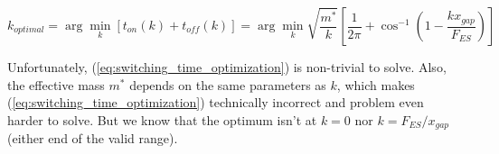 \begin{equation}
    k_{optimal} = \arg\min_k \left[ t_{on}(k) + t_{off}(k) \right] = \arg\min_k \sqrt{\frac{m^*}{k}} \left[ \frac{1}{2\pi} + \cos^{-1}{\left( 1 - \frac{k x_{gap}}{F_{ES}} \right)} \right]
    \label{eq:switching_time_optimization}
\end{equation}

Unfortunately, (\ref{eq:switching_time_optimization}) is non-trivial to solve.
Also, the effective mass $m^*$ depends on the same parameters as $k$, which makes (\ref{eq:switching_time_optimization}) technically incorrect and problem even harder to solve.
But we know that the optimum isn't at $k=0$ nor $k=F_{ES}/x_{gap}$ (either end of the valid range).
